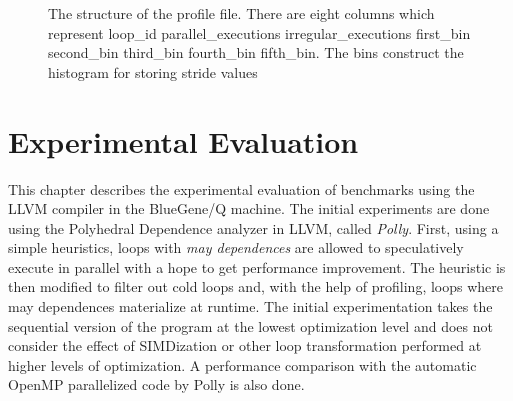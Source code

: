 \documentclass[10pt]{report}          %
\begin{document}
\begin{figure}[h]
\begin{center}
\renewcommand{\figure}{Fig.}
\caption{ The structure of the profile file.  There are eight columns which represent loop\_id  parallel\_executions  irregular\_executions  first\_bin  second\_bin  third\_bin  fourth\_bin  fifth\_bin. The bins construct the histogram for storing stride values}
\end{center}
\label{fig:profile_file}
\end{figure}

\chapter{Experimental Evaluation}

This chapter describes the experimental evaluation of benchmarks using the LLVM compiler in the BlueGene/Q machine.  The initial experiments are done using the Polyhedral Dependence analyzer in LLVM, called \textit{Polly}.  First, using a simple heuristics, loops with \textit{may dependences} are allowed to speculatively execute in parallel with a hope to get performance improvement.  The heuristic is then modified to filter out cold loops and, with the help of profiling, loops where may dependences materialize at runtime.  The initial experimentation takes the sequential version of the program at the lowest optimization level and does not consider the effect of SIMDization or other loop transformation performed at higher levels of optimization.  A performance comparison with the automatic OpenMP parallelized code by Polly is also done.\\
\end{document}
